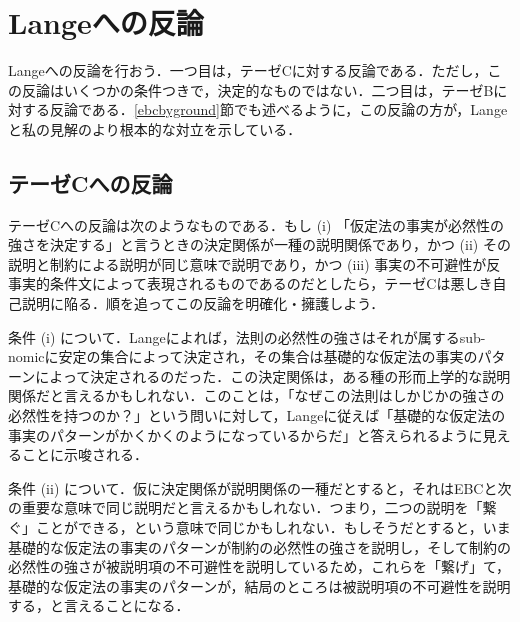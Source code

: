 \documentclass[dvipdfmx,twoside,11pt,uplatex]{jsarticle}
\theoremstyle{definition}
\begin{document}
\section{Langeへの反論}\label{objection}
Langeへの反論を行おう．一つ目は，テーゼCに対する反論である．ただし，この反論はいくつかの条件つきで，決定的なものではない．二つ目は，テーゼBに対する反論である．\ref{ebcbyground}節でも述べるように，この反論の方が，Langeと私の見解のより根本的な対立を示している．

\subsection{テーゼCへの反論}\label{objectiontoc}
テーゼCへの反論は次のようなものである．もし (i) 「仮定法の事実が必然性の強さを決定する」と言うときの決定関係が一種の説明関係であり，かつ (ii) その説明と制約による説明が同じ意味で説明であり，かつ (iii) 事実の不可避性が反事実的条件文によって表現されるものであるのだとしたら，テーゼCは悪しき自己説明に陥る．順を追ってこの反論を明確化・擁護しよう．

条件 (i) について．Langeによれば，法則の必然性の強さはそれが属するsub-nomicに安定の集合によって決定され，その集合は基礎的な仮定法の事実のパターンによって決定されるのだった．この決定関係は，ある種の形而上学的な説明関係だと言えるかもしれない．このことは，「なぜこの法則はしかじかの強さの必然性を持つのか？」という問いに対して，Langeに従えば「基礎的な仮定法の事実のパターンがかくかくのようになっているからだ」と答えられるように見えることに示唆される．

条件 (ii) について．仮に決定関係が説明関係の一種だとすると，それはEBCと次の重要な意味で同じ説明だと言えるかもしれない．つまり，二つの説明を「繋ぐ」ことができる，という意味で同じかもしれない．もしそうだとすると，いま基礎的な仮定法の事実のパターンが制約の必然性の強さを説明し，そして制約の必然性の強さが被説明項の不可避性を説明しているため，これらを「繋げ」て，基礎的な仮定法の事実のパターンが，結局のところは被説明項の不可避性を説明する，と言えることになる．
\end{document}
